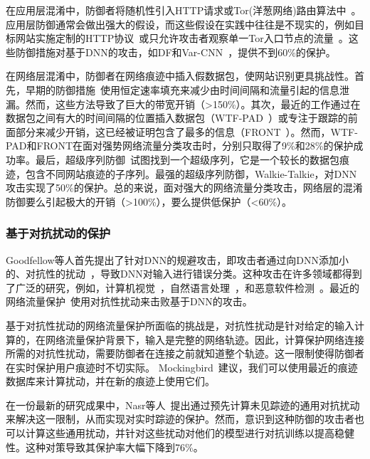 \documentclass[degree=master,cjk-font=noto]{thuthesis}
\begin{document}
在应用层混淆中，防御者将随机性引入HTTP请求或Tor(洋葱网络)路由算法中~\cite{CherubinHayesJuarez,TrafficSliver}。应用层防御通常会做出强大的假设，而这些假设在实践中往往是不现实的，例如目标网站实施定制的HTTP协议~\cite{CherubinHayesJuarez}或只允许攻击者观察单一Tor入口节点的流量~\cite{TrafficSliver}。这些防御措施对基于DNN的攻击，如DF和Var-CNN~\cite{df,var-cnn}，提供不到60\%的保护。

在网络层混淆中，防御者在网络痕迹中插入假数据包，使网站识别更具挑战性。首先，早期的防御措施~\cite{cs-buflo,2660362}使用恒定速率填充来减少由时间间隔和流量引起的信息泄漏。然而，这些方法导致了巨大的带宽开销（>150\%）。其次，最近的工作通过在数据包之间有大的时间间隔的位置插入数据包（WTF-PAD~\cite{10.1007}）或专注于跟踪的前面部分来减少开销，这已经被证明包含了最多的信息（FRONT~\cite{247654}）。然而，WTF-PAD和FRONT在面对强势网络流量分类攻击时，分别只取得了9\%和28\%的保护成功率。最后，超级序列防御~\cite{glove,203876}试图找到一个超级序列，它是一个较长的数据包痕迹，包含不同网站痕迹的子序列。最强的超级序列防御，Walkie-Talkie，对DNN攻击实现了50\%的保护。总的来说，面对强大的网络流量分类攻击，网络层的混淆防御要么引起极大的开销（>100\%），要么提供低保护（<60\%）。

\subsubsection{基于对抗扰动的保护}

Goodfellow等人首先提出了针对DNN的规避攻击，即攻击者通过向DNN添加小的、对抗性的扰动~\cite{goodfellow2015explaining}，导致DNN对输入进行错误分类。这种攻击在许多领域都得到了广泛的研究，例如，计算机视觉~\cite{7958570,Chen_Sharma_Zhang_Yi_Hsieh_2018}，自然语言处理~\cite{HotFlip,10.1145/3374217}，和恶意软件检测~\cite{10.1007/978-3-319-66399-9_4,8844597}。最近的网络流量保护~\cite{9219593,9265277}使用对抗性扰动来击败基于DNN的攻击。

基于对抗性扰动的网络流量保护所面临的挑战是，对抗性扰动是针对给定的输入计算的，在网络流量保护背景下，输入是完整的网络轨迹。因此，计算保护网络连接所需的对抗性扰动，需要防御者在连接之前就知道整个轨迹。这一限制使得防御者在实时保护用户痕迹时不切实际。
Mockingbird~\cite{9265277}建议，我们可以使用最近的痕迹数据库来计算扰动，并在新的痕迹上使用它们。

在一份最新的研究成果中，Nasr等人~\cite{272174}提出通过预先计算未见踪迹的通用对抗扰动来解决这一限制，从而实现对实时踪迹的保护。然而，意识到这种防御的攻击者也可以计算这些通用扰动，并针对这些扰动对他们的模型进行对抗训练以提高稳健性。这种对策导致其保护率大幅下降到76\%。
\end{document}
